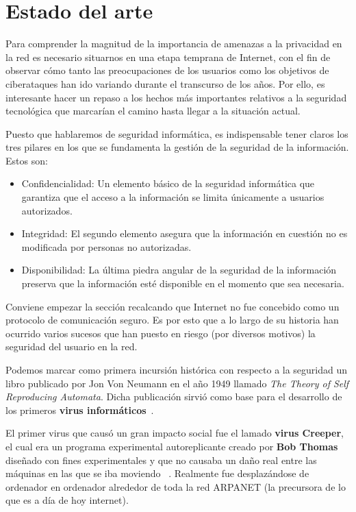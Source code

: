 \chapter{Estado del arte}
\label{chap:estadodelarte}

 \label{sec:historia}

Para comprender la magnitud de la importancia de amenazas a la privacidad en la red es necesario situarnos en una etapa temprana de Internet, con el fin de observar cómo tanto las preocupaciones de los usuarios como los objetivos de ciberataques han ido variando durante el transcurso de los años. Por ello, es interesante hacer un repaso a los hechos más importantes relativos a la seguridad tecnológica que marcarían el camino hasta llegar a la situación actual.

Puesto que hablaremos de seguridad informática, es indispensable tener claros los tres pilares en los que se fundamenta la gestión de la seguridad de la información. Estos son:
\begin{itemize}
	\item Confidencialidad: Un elemento básico de la seguridad informática que garantiza que el acceso a la información se limita únicamente a usuarios autorizados.
	\item Integridad: El segundo elemento asegura que la información en cuestión no es modificada por personas no autorizadas.
	\item Disponibilidad: La última piedra angular de la seguridad de la información preserva que la información esté disponible en el momento que sea necesaria.
\end{itemize}

Conviene empezar la sección recalcando que Internet no fue concebido como un protocolo de comunicación seguro. 
Es por esto que a lo largo de su historia han ocurrido varios sucesos que han puesto en riesgo (por diversos motivos) la seguridad del usuario en la red.

Podemos marcar como primera incursión histórica con respecto a la seguridad un libro publicado por Jon Von Neumann en el año 1949 llamado \textit{The Theory of Self Reproducing Automata}. Dicha publicación sirvió como  base para el desarrollo de los primeros \textbf{virus informáticos}~\cite{article:automata}.

El primer virus que causó un gran impacto social fue el lamado \textbf{virus Creeper}, el cual era un programa experimental autoreplicante creado por \textbf{Bob Thomas} diseñado con fines experimentales y que no causaba un daño real entre las máquinas en las que se iba moviendo ~\cite{article:motivationvirus}.
Realmente fue desplazándose de ordenador en ordenador alrededor de toda la red ARPANET (la precursora de lo que es a día de hoy internet).

